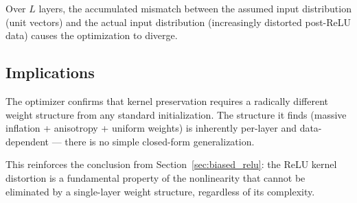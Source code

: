 Over $L$ layers, the accumulated mismatch between the assumed input
distribution (unit vectors) and the actual input distribution
(increasingly distorted post-ReLU data) causes the optimization to
diverge.

\subsection{Implications}

The optimizer confirms that kernel preservation requires a radically
different weight structure from any standard initialization.
The structure it finds (massive inflation + anisotropy + uniform
weights) is inherently per-layer and data-dependent --- there is no
simple closed-form generalization.

This reinforces the conclusion from Section~\ref{sec:biased_relu}:
the ReLU kernel distortion is a fundamental property of the nonlinearity
that cannot be eliminated by a single-layer weight structure,
regardless of its complexity.
